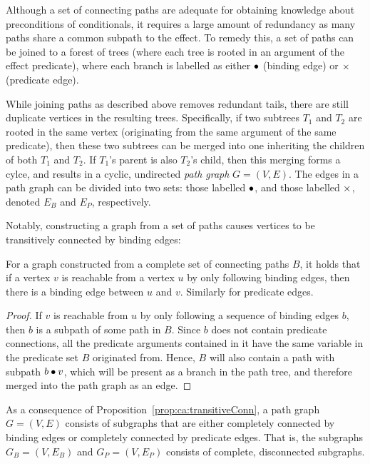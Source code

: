 \documentclass[../Master.tex]{subfiles}
\begin{document}
\providecommand{\master}{..}

Although a set of connecting paths are adequate for obtaining knowledge about preconditions of conditionals, it requires a large amount of redundancy as many paths share a common subpath to the effect. To remedy this, a set of paths can be joined to a forest of trees (where each tree is rooted in an argument of the effect predicate), where each branch is labelled as either $\bullet$ (binding edge) or $\times$ (predicate edge).

While joining paths as described above removes redundant tails, there are still duplicate vertices in the resulting trees. Specifically, if two subtrees $T_1$ and $T_2$ are rooted in the same vertex (originating from the same argument of the same predicate), then these two subtrees can be merged into one inheriting the children of both $T_1$ and $T_2$. If $T_1$'s parent is also $T_2$'s child, then this merging forms a cylce, and results in a cyclic, undirected \emph{path graph} $G = (V, E)$. The edges in a path graph can be divided into two sets: those labelled $\bullet$, and those labelled $\times$, denoted $E_B$ and $E_P$, respectively.

Notably, constructing a graph from a set of paths causes vertices to be transitively connected by binding edges:

\begin{proposition}\label{prop:ca:transitiveConn}
    For a graph constructed from a complete set of connecting paths $B$, it holds that if a vertex $v$ is reachable from a vertex $u$ by only following binding edges, then there is a binding edge between $u$ and $v$. Similarly for predicate edges.
\end{proposition}

\begin{proof}
   If $v$ is reachable from $u$ by only following a sequence of binding edges $b$, then $b$ is a subpath of some path in $B$. Since $b$ does not contain predicate connections, all the predicate arguments contained in it have the same variable in the predicate set $B$ originated from. Hence, $B$ will also contain a path with subpath $b \bullet v$, which will be present as a branch in the path tree, and therefore merged into the path graph as an edge.
\end{proof}

As a consequence of Proposition~\ref{prop:ca:transitiveConn}, a path graph $G = (V,E)$ consists of subgraphs that are either completely connected by binding edges or completely connected by predicate edges. That is, the subgraphs $G_B = \left(V, E_B \right)$ and $G_P = \left( V, E_P \right)$ consists of complete, disconnected subgraphs.
\end{document}
